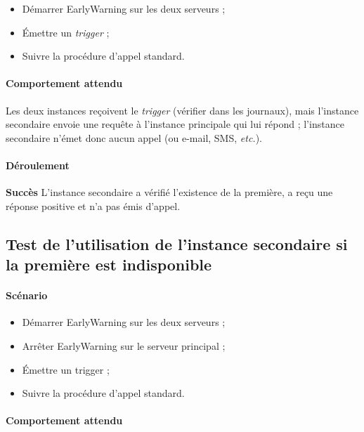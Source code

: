 \documentclass{article}
\begin{document}
\begin{itemize}
    \item Démarrer EarlyWarning sur les deux serveurs ;
    \item Émettre un \emph{trigger} ;
    \item Suivre la procédure d'appel standard.
\end{itemize}

\paragraph{Comportement attendu\\}

Les deux instances reçoivent le \emph{trigger} (vérifier dans les journaux), mais l'instance secondaire envoie une requête à l'instance principale qui lui répond ; l'instance secondaire n'émet donc aucun appel (ou e-mail, SMS, \emph{etc.}).

\paragraph{Déroulement\\}

\textbf{Succès} L'instance secondaire a vérifié l'existence de la première, a reçu une réponse positive et n'a pas émis d'appel.

\subsection{Test de l'utilisation de l'instance secondaire si la première est indisponible}

\paragraph{Scénario}

\begin{itemize}
    \item Démarrer EarlyWarning sur les deux serveurs ;
    \item Arrêter EarlyWarning sur le serveur principal ;
    \item Émettre un trigger ;
    \item Suivre la procédure d'appel standard.
\end{itemize}

\paragraph{Comportement attendu\\}
\end{document}
